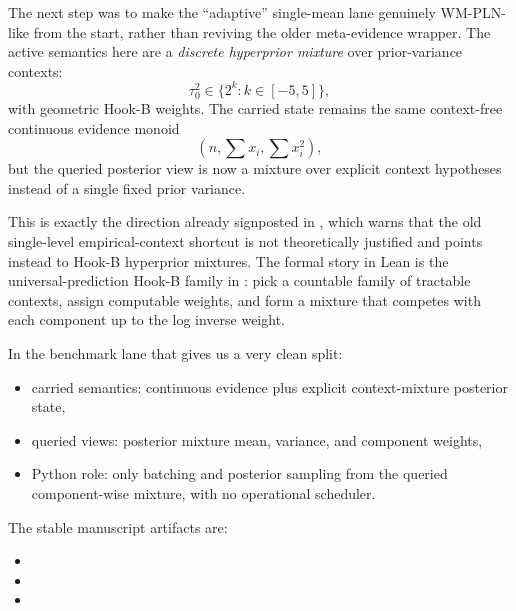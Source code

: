 \documentclass[11pt,openany]{report}
\begin{document}
The next step was to make the ``adaptive'' single-mean lane genuinely
WM-PLN-like from the start, rather than reviving the older meta-evidence
wrapper.  The active semantics here are a \emph{discrete hyperprior mixture}
over prior-variance contexts:
\[
  \tau_0^2 \in \{ 2^k : k \in [-5,5] \},
\]
with geometric Hook-B weights.  The carried state remains the same
context-free continuous evidence monoid
\[
  (n, \sum x_i, \sum x_i^2),
\]
but the queried posterior view is now a mixture over explicit context
hypotheses instead of a single fixed prior variance.

This is exactly the direction already signposted in
,
which warns that the old single-level empirical-context shortcut is not
theoretically justified and points instead to Hook-B hyperprior mixtures.
The formal story in Lean is the universal-prediction Hook-B family in
:
pick a countable family of tractable contexts, assign computable weights, and
form a mixture that competes with each component up to the log inverse weight.

In the benchmark lane that gives us a very clean split:
\begin{itemize}
\item carried semantics: continuous evidence plus explicit context-mixture
  posterior state,
\item queried views: posterior mixture mean, variance, and component weights,
\item Python role: only batching and posterior sampling from the queried
  component-wise mixture, with no operational scheduler.
\end{itemize}

The stable manuscript artifacts are:
\begin{itemize}
\item {}
\item {}
\item {}
\end{itemize}
\end{document}
